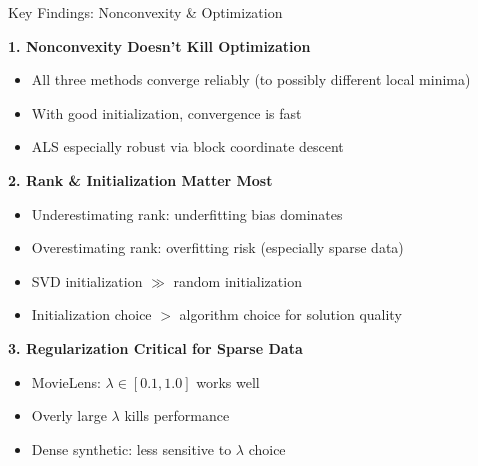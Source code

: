 \documentclass[aspectratio=169,usenames,dvipsnames]{beamer}
\begin{document}
\begin{frame}{Key Findings: Nonconvexity \& Optimization}

\textbf{1. Nonconvexity Doesn't Kill Optimization}
\begin{itemize}
  \item All three methods converge reliably (to possibly different local minima)
  \item With good initialization, convergence is fast
  \item ALS especially robust via block coordinate descent
\end{itemize}

\vspace{0.3cm}

\textbf{2. Rank \& Initialization Matter Most}
\begin{itemize}
  \item Underestimating rank: underfitting bias dominates
  \item Overestimating rank: overfitting risk (especially sparse data)
  \item SVD initialization $\gg$ random initialization
  \item Initialization choice $>$ algorithm choice for solution quality
\end{itemize}

\vspace{0.3cm}

\textbf{3. Regularization Critical for Sparse Data}
\begin{itemize}
  \item MovieLens: $\lambda \in [0.1, 1.0]$ works well
  \item Overly large $\lambda$ kills performance
  \item Dense synthetic: less sensitive to $\lambda$ choice
\end{itemize}

\end{frame}
\end{document}
